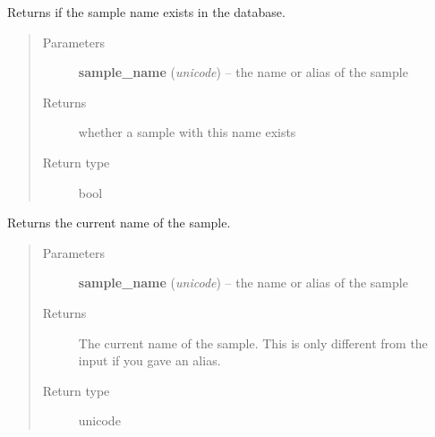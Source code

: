 \documentclass[a4paper,11pt,english]{sphinxmanual}
\begin{document}

\begin{fulllineitems}
\label{programming/utilities:samples.utils.views.does_sample_exist}
Returns  if the sample name exists in the database.
\begin{quote}\begin{description}
\item[{Parameters}] \leavevmode
\textbf{sample\_name} (\emph{unicode}) -- the name or alias of the sample

\item[{Returns}] \leavevmode
whether a sample with this name exists

\item[{Return type}] \leavevmode
bool

\end{description}\end{quote}

\end{fulllineitems}


\begin{fulllineitems}
\label{programming/utilities:samples.utils.views.normalize_sample_name}
Returns the current name of the sample.
\begin{quote}\begin{description}
\item[{Parameters}] \leavevmode
\textbf{sample\_name} (\emph{unicode}) -- the name or alias of the sample

\item[{Returns}] \leavevmode
The current name of the sample.  This is only different from the input if
you gave an alias.

\item[{Return type}] \leavevmode
unicode

\end{description}\end{quote}

\end{fulllineitems}

\end{document}
